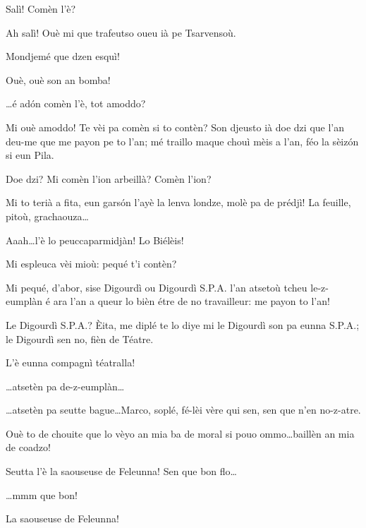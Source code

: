 \begin{drama}


\Cimaspeaks{} Salì! Comèn l'è?

\Jeanspeaks Ah salì! Ouè mi que trafeutso oueu ià pe Tsarvensoù.

\Cimaspeaks Mondjemé que dzen esquì!

\Jeanspeaks Ouè, ouè son an bomba!

\Cimaspeaks \ldots é ad\'on comèn l'è, tot amoddo?

\Jeanspeaks Mi ouè amoddo! Te vèi pa comèn si to contèn? Son djeusto ià doe dzi que l'an deu-me que me payon pe to l'an; mé traillo maque chouì mèis a l'an, féo la sèiz\'on si eun Pila.

\Cimaspeaks {} Doe dzi? Mi comèn l'ion arbeillà? Comèn l'ion?

\Jeanspeaks Mi to terià a fita, eun gars\'on l'ayè la lenva londze, molè pa de prédjì! La feuille, pitoù, grachaouza\ldots

\Cimaspeaks {} Aaah\ldots l'è lo peuccaparmidjàn! Lo Biélèis!

\Marcospeaks Mi espleuca vèi mioù: pequé t'i contèn?

\Jeanspeaks Mi pequé, d'abor, sise Digourdì ou Digourdì S.P.A. l’an atsetoù tcheu le-z-eumplàn é ara l'an a queur lo bièn étre de no travailleur: me payon to l'an!

\Marcospeaks Le Digourdì S.P.A.? Èita, me diplé te lo diye mi le Digourdì son pa eunna S.P.A.; le Digourdì sen no, fièn de Téatre.

\Cimaspeaks L'è eunna compagnì téatralla!

\Marcospeaks \ldots atsetèn pa de-z-eumplàn\ldots

\Cimaspeaks \ldots atsetèn pa seutte bague\ldots Marco, soplé, fé-lèi vère qui sen, sen que n'en no-z-atre.

\Marcospeaks Ouè to de chouite que lo vèyo an mia ba de moral si pouo ommo\ldots baillèn an mia de coadzo!


\Cimaspeaks {} Seutta l'è la saouseuse de Feleunna! Sen que bon flo\ldots

\Jeanspeaks {} \ldots mmm que bon!

\Cimaspeaks La saouseuse de Feleunna!

 

\end{drama}
